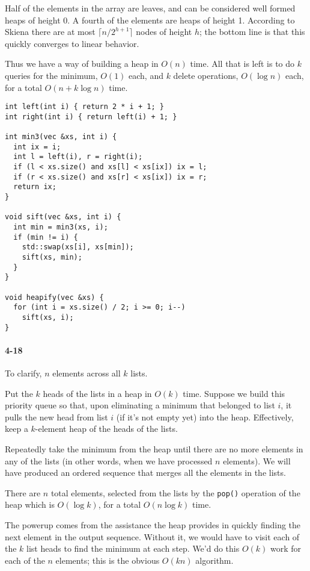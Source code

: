 \documentclass{report}
\begin{document}
Half of the elements in the array are leaves, and can be considered well formed heaps of height 0. A fourth of the elements are heaps of height 1. According to Skiena there are at most $\lceil n/2^{h+1}\rceil$ nodes of height $h$; the bottom line is that this quickly converges to linear behavior.

Thus we have a way of building a heap in $O(n)$ time. All that is left is to do $k$ queries for the minimum, $O(1)$ each, and $k$ delete operations, $O(\log n)$ each, for a total $O(n + k\log n)$ time.

\begin{lstlisting}
int left(int i) { return 2 * i + 1; }
int right(int i) { return left(i) + 1; }

int min3(vec &xs, int i) {
  int ix = i;
  int l = left(i), r = right(i);
  if (l < xs.size() and xs[l] < xs[ix]) ix = l;
  if (r < xs.size() and xs[r] < xs[ix]) ix = r;
  return ix;
}

void sift(vec &xs, int i) {
  int min = min3(xs, i);
  if (min != i) {
    std::swap(xs[i], xs[min]);
    sift(xs, min);
  }
}

void heapify(vec &xs) {
  for (int i = xs.size() / 2; i >= 0; i--)
    sift(xs, i);
}
\end{lstlisting}

\paragraph{4-18} To clarify, $n$ elements across all $k$ lists.

Put the $k$ heads of the lists in a heap in $O(k)$ time. Suppose we build this priority queue so that, upon eliminating a minimum that belonged to list $i$, it pulls the new head from list $i$ (if it's not empty yet) into the heap. Effectively, keep a $k$-element heap of the heads of the lists.

Repeatedly take the minimum from the heap until there are no more elements in any of the lists (in other words, when we have processed $n$ elements). We will have produced an ordered sequence that merges all the elements in the lists.

There are $n$ total elements, selected from the lists by the \lstinline!pop()! operation of the heap which is $O(\log k)$, for a total $O(n\log k)$ time.

\medskip

The powerup comes from the assistance the heap provides in quickly finding the next element in the output sequence. Without it, we would have to visit each of the $k$ list heads to find the minimum at each step. We'd do this $O(k)$ work for each of the $n$ elements; this is the obvious $O(kn)$ algorithm.
\end{document}

